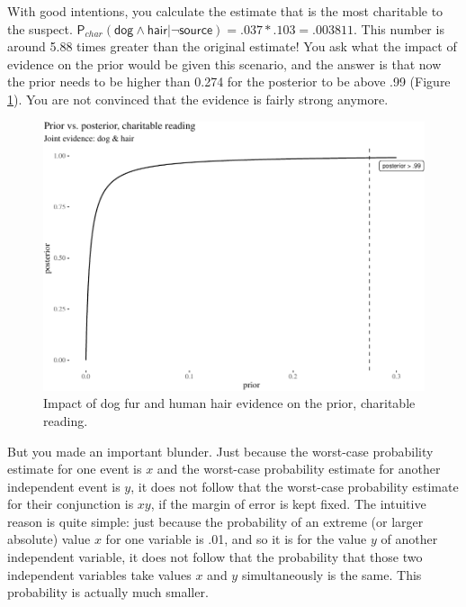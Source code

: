 \documentclass[
  10pt,
  dvipsnames,enabledeprecatedfontcommands]{scrartcl}
\newcommand{\s}[1]{\mbox{$\mathsf{#1}$}}
\begin{document}
With good intentions, you calculate the estimate that is the most
charitable to the suspect.
\(\mathsf{P}_{char}(\s{dog}\wedge \s{hair} \vert \neg \s{source}) = .037 * .103 =.003811\).
This number is around 5.88 times greater than the original estimate! You
ask what the impact of evidence on the prior would be given this
scenario, and the answer is that now the prior needs to be higher than
0.274 for the posterior to be above .99 (Figure
\ref{fig:impactOfCharitable}). You are not convinced that the evidence
is fairly strong anymore.

\begin{figure}[H]


\begin{center}\includegraphics[width=0.8\linewidth]{chapter-outline_files/figure-latex/fig:charitableImpact7-1} \end{center}

\caption{Impact of dog fur and human hair evidence on the prior, charitable reading.}

\label{fig:impactOfCharitable}

\end{figure}

But you made an important blunder. Just
because the worst-case probability estimate for one event is \(x\) and
the worst-case probability estimate for another independent event is
\(y\), it does not follow that the worst-case probability estimate for
their conjunction is \(xy\), if the margin of error is kept fixed. The
intuitive reason is quite simple: just because the probability of an
extreme (or larger absolute) value \(x\) for one variable is .01, and so
it is for the value \(y\) of another independent variable, it does not
follow that the probability that those two independent variables take
values \(x\) and \(y\) simultaneously is the same. This probability is
actually much smaller.
\end{document}
